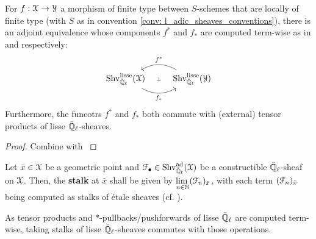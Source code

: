             \begin{proposition} \label{prop: *_pullbacks_and_pushforwards_of_l_adic_sheaves}
                For $f: \mathcal{X} \to \mathcal{Y}$ a morphism of finite type between $S$-schemes that are locally of finite type (with $S$ as in convention \ref{conv: l_adic_sheaves_conventions}), there is an adjoint equivalence whose components $f^*$ and $f_*$ are computed term-wise as in \cite[\href{https://stacks.math.columbia.edu/tag/03PZ}{Tag 03PZ}]{stacks} and  \cite[\href{https://stacks.math.columbia.edu/tag/03PV}{Tag 03PV}]{stacks} respectively:
                    $$
                        \begin{tikzcd}
                        	{\Shv_{\bar{\Q}_{\ell}}^{\lisse}(\calX)} & {\Shv_{\bar{\Q}_{\ell}}^{\lisse}(\calY)}
                        	\arrow[""{name=0, anchor=center, inner sep=0}, "{f_*}"', bend right, from=1-1, to=1-2]
                        	\arrow[""{name=1, anchor=center, inner sep=0}, "{f^*}"', bend right, from=1-2, to=1-1]
                        	\arrow["\dashv"{anchor=center, rotate=-90}, draw=none, from=1, to=0]
                        \end{tikzcd}
                    $$
                Furthermore, the funcotrs $f^*$ and $f_*$ both commute with (external) tensor products of lisse $\bar{\mathbb{Q}}_{\ell}$-sheaves.
            \end{proposition}
                \begin{proof}
                    Combine \cite[Proposition 8.3]{laszlo_olsson_adic_sheaves_on_artin_stacks_2} with \cite[Theorem II.7.1]{kiehl_weissauer_weil_conjecture_perverse_sheaves_and_l_adic_fourier_transform}
                \end{proof}
            
            \begin{definition} \label{def: stalks_of_constructible_adic_sheaves}
                \cite[Definition 1.4.4.3]{conrad_etale_cohomology} Let $\bar{x} \in \mathcal{X}$ be a geometric point and $\mathcal{F}_{\bullet} \in \mathrm{Shv}_{\bar{\mathbb{Q}}_{\ell}}^{\mathrm{ad}}(\mathcal{X})$ be a constructible $\bar{\mathbb{Q}}_{\ell}$-sheaf on $\mathcal{X}$. Then, the \textbf{stalk} at $\bar{x}$ shall be given by $\underset{n \in \mathbb{N}}{\operatorname{lim} \:} (\mathcal{F}_n)_{\bar{x}}$, with each term $(\mathcal{F}_n)_{\bar{x}}$ being computed as stalks of \'etale sheaves (cf. \cite[\href{https://stacks.math.columbia.edu/tag/040R}{Tag 040R}]{stacks}).
            \end{definition}
            \begin{remark}
                As tensor products and $*$-pullbacks/pushforwards of lisse $\bar{\mathbb{Q}}_{\ell}$ are computed term-wise, taking stalks of lisse $\bar{\mathbb{Q}}_{\ell}$-sheaves commutes with those operations.
            \end{remark}
            
